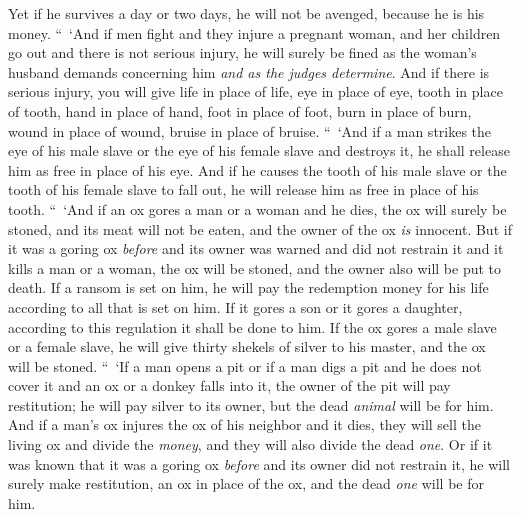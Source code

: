 \begin{biblechapter}
\verse Yet if he survives a day or two days, he will not be avenged, because he is his money.
\verse “ ‘And if men fight and they injure a pregnant woman, and her children go out and there is not serious injury, he will surely be fined as the woman’s husband demands concerning him \textit{and as the judges determine}.
\verse And if there is serious injury, you will give life in place of life,
\verse eye in place of eye, tooth in place of tooth, hand in place of hand, foot in place of foot,
\verse burn in place of burn, wound in place of wound, bruise in place of bruise.
\verse “ ‘And if a man strikes the eye of his male slave or the eye of his female slave and destroys it, he shall release him as free in place of his eye.
\verse And if he causes the tooth of his male slave or the tooth of his female slave to fall out, he will release him as free in place of his tooth.
\verse “ ‘And if an ox gores a man or a woman and he dies, the ox will surely be stoned, and its meat will not be eaten, and the owner of the ox \textit{is} innocent.
\verse But if it was a goring ox \textit{before} and its owner was warned and did not restrain it and it kills a man or a woman, the ox will be stoned, and the owner also will be put to death.
\verse If a ransom is set on him, he will pay the redemption money for his life according to all that is set on him.
\verse If it gores a son or it gores a daughter, according to this regulation it shall be done to him.
\verse If the ox gores a male slave or a female slave, he will give thirty shekels of silver to his master, and the ox will be stoned.
\verse “ ‘If a man opens a pit or if a man digs a pit and he does not cover it and an ox or a donkey falls into it,
\verse the owner of the pit will pay restitution; he will pay silver to its owner, but the dead \textit{animal} will be for him.
\verse And if a man’s ox injures the ox of his neighbor and it dies, they will sell the living ox and divide the \textit{money}, and they will also divide the dead \textit{one}.
\verse Or if it was known that it was a goring ox \textit{before} and its owner did not restrain it, he will surely make restitution, an ox in place of the ox, and the dead \textit{one} will be for him.
\end{biblechapter}

